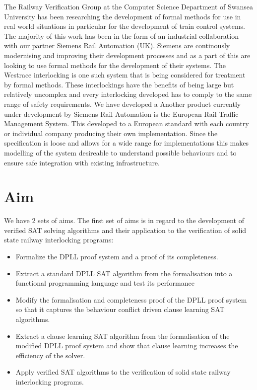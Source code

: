 The Railway Verification Group at the Computer Science Department of Swansea University has been researching the development of formal methods for use in real world situations in particular for the development of train control systems. The majority of this work has been in the form of an industrial collaboration with our partner Siemens Rail Automation (UK). Siemens are continously modernising and improving their development processes and as a part of this are looking to use formal methods for the development of their systems. The Westrace interlocking is one such system that is being considered for treatment by formal methods. These interlockings have the benefits of being large but relatively uncomplex and every interlocking developed has to comply to the same range of safety requirements.  We have developed a Another product currently under development by Siemens Rail Automation is the European Rail Traffic Management System. This developed to a European  standard with each country or individual company producing their own implementation. Since the specification is loose and allows for a wide range for implementations this makes modelling of the system desireable to understand possible behaviours and to ensure safe integration with existing infrastructure.





\section{Aim}
We have 2 sets of aims. The first set of aims is in regard to the development of verified SAT solving algorithms and their application to the verification of solid state railway interlocking programs: 


\medskip

\begin{itemize}

\item Formalize the DPLL proof system and a proof of its completeness.

\item Extract a standard DPLL SAT algorithm from the formalisation into a functional programming language and test its performance

\item Modify the formalisation and completeness proof  of the DPLL proof system so that it captures the behaviour conflict driven clause learning SAT algorithms.

\item Extract a clause learning SAT algorithm from the formalisation  of the modified DPLL proof system and show that clause learning increases the efficiency of the solver.

\item Apply verified SAT algorithms to the verification of solid state railway interlocking programs. 

\end{itemize}

